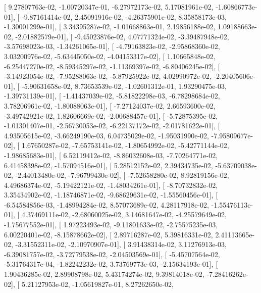 \documentclass{article}
\begin{document}
       [  9.27807763e-02,  -1.00720347e-01,  -6.27972173e-02,
          5.17081961e-02,  -1.60866773e-01],
       [ -9.87161414e-02,   2.45091916e-02,  -4.26375901e-02,
          8.35858173e-03,  -1.30001299e-01],
       [  3.34395287e-02,  -1.01668863e-01,   2.19856188e-02,
          1.09188663e-02,  -2.01882579e-01],
       [ -9.45023876e-02,   4.07771324e-02,  -3.39487948e-02,
         -3.57698023e-03,  -1.34261065e-01],
       [ -4.79163823e-02,  -2.95868360e-02,   3.03200976e-02,
         -5.63445050e-02,  -4.04153317e-02],
       [  1.10665848e-02,  -6.25447270e-02,  -8.59345297e-02,
         -1.11369397e-02,  -6.80406245e-02],
       [ -3.14923054e-02,  -7.95288063e-02,  -5.87925922e-02,
          4.02990972e-02,  -2.20405606e-01],
       [ -5.90631658e-02,   8.73653539e-02,  -1.02601312e-01,
          1.93290475e-03,  -1.39731139e-01],
       [ -1.41437039e-02,  -5.81822298e-03,  -6.78298684e-02,
          3.78206961e-02,  -1.80088063e-01],
       [ -7.27124037e-02,   2.66593600e-02,  -3.49742921e-02,
          1.82606669e-02,  -2.00688457e-01],
       [ -5.72875395e-02,  -1.01301407e-01,  -2.56730053e-02,
         -6.22137172e-02,  -2.01781622e-01],
       [  4.93505615e-02,  -3.66249190e-03,   6.04735029e-02,
         -1.95031990e-02,  -7.95809677e-02],
       [  1.67650287e-02,  -7.65753141e-02,  -1.80654992e-02,
         -5.42771144e-02,  -1.98685683e-01],
       [  6.52119412e-02,  -8.86032608e-03,  -7.70264771e-02,
          6.41458398e-02,  -1.57094516e-01],
       [  5.28512152e-02,   2.39434735e-02,  -5.63709038e-02,
         -2.44013480e-02,  -7.96799430e-02],
       [ -7.52658280e-02,   8.92819156e-02,   4.49686374e-02,
         -5.19422121e-02,  -1.48034261e-01],
       [ -8.70732832e-02,   3.35434902e-02,  -1.18746871e-02,
         -9.68629631e-02,  -1.55560456e-01],
       [ -6.54584856e-03,  -1.48994284e-02,   8.57073689e-02,
          4.28117918e-02,  -1.55476113e-01],
       [  4.37469111e-02,  -2.68060025e-02,   3.14681647e-02,
         -4.25579649e-02,  -1.75677552e-01],
       [  1.97223493e-02,  -9.11801633e-02,  -2.75575235e-03,
          6.00220401e-02,  -8.15878662e-02],
       [  2.89716287e-02,   5.39816331e-02,   2.41113665e-02,
         -3.31552311e-02,  -2.10970907e-01],
       [  3.91438314e-02,   3.11276913e-03,  -6.39081757e-02,
         -3.72779538e-02,  -2.04503569e-01],
       [ -5.45707564e-02,  -5.31764317e-04,  -1.82242232e-02,
          3.73769773e-03,  -2.15634193e-01],
       [  1.90436285e-02,   2.89908798e-02,   5.43174274e-02,
          9.39814018e-02,  -7.28416262e-02],
       [  5.21127953e-02,  -1.05619827e-01,   8.27262650e-02,
\end{document}
